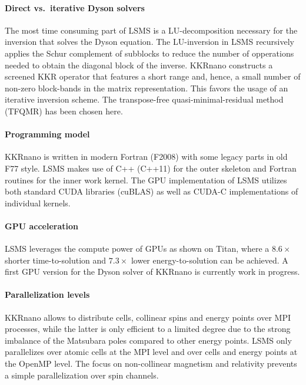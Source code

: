 \documentclass{llncs}
\def\KKRnano{{KKRnano}}
\def\LSMS{{LSMS}}
\begin{document}
\paragraph{Direct vs.~iterative Dyson solvers}
The most time consuming part of \LSMS{} is a LU-decomposition necessary 
for the inversion that solves the Dyson equation. The LU-inversion in
\LSMS{} recursively applies the Schur complement of subblocks to
reduce the number of opperations needed to obtain the diagonal block
of the inverse.\cite{Eisenbach2016} 
%
%
\KKRnano{} constructs a screened KKR operator that features a short range and, hence, a small number
of non-zero block-bands in the matrix representation. This favors the usage of an iterative
inversion scheme. The transpose-free quasi-minimal-residual method (TFQMR) has been chosen here.

\paragraph{Programming model}
\KKRnano{} is written in modern Fortran (F2008) with some legacy parts in old F77 style.
\LSMS{} makes use of C++ (C++11) for the outer skeleton and Fortran routines
for the inner work kernel.
The GPU implementation of \LSMS{} utilizes both standard CUDA
libraries (cuBLAS) as well as CUDA-C implementations of individual kernels. 
%

\paragraph{GPU acceleration}
\LSMS{} leverages the compute power of GPUs as shown on Titan, where a $8.6\times$ shorter
time-to-solution and $7.3\times$ lower energy-to-solution can be achieved.
A first GPU version for the Dyson solver of \KKRnano{} is currently work in progress.

\paragraph{Parallelization levels}
\KKRnano{} allows to distribute cells, collinear spins and energy points over MPI processes,
while the latter is only efficient to a limited degree due to the strong imbalance of the 
Matsubara poles compared to other energy points. \LSMS{} only
parallelizes over atomic cells at the MPI level and over cells and
energy points at the OpenMP level. The focus on non-collinear
magnetism and relativity prevents a simple parallelization over spin channels.
\end{document}
